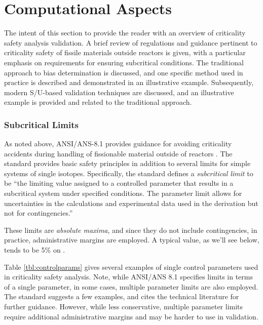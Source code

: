 
\section*{Computational Aspects}

The intent of this section to provide the reader with an 
overview of criticality safety analysis validation. A brief 
review of regulations and guidance pertinent to criticality safety of 
fissile materials outside reactors is given, with a particular emphasis on 
requirements for ensuring subcritical conditions. The traditional approach to 
bias determination is discussed, and one specific method used in practice
is described and demonstrated in an illustrative example. Subsequently, 
modern S/U-based validation techniques are discussed, and an 
illustrative example is provided and related to the traditional approach.


\subsubsection{Subcritical Limits}

As noted above, ANSI/ANS-8.1 provides guidance 
for avoiding criticality accidents during handling of fissionable material 
outside of reactors \cite{ans8_1}. The standard provides basic safety principles 
in addition to several limits for simple systems of single isotopes.  
Specifically, the standard defines a \textit{subcritical limit} to be ``the 
limiting value assigned to a controlled parameter that results in a subcritical 
system under specified conditions. The parameter limit allows for 
uncertainties in the calculations and experimental data used in the derivation 
but not for contingencies.''

These limits are \textit{absolute maxima}, and since they do not include 
contingencies, in practice, administrative margins are employed.  A typical 
value, as we'll see below, tends to be 5\% on \keff.

Table \ref{tbl:controlparams} gives several examples of single control 
parameters used in criticality safety analysis.  Note, while ANSI/ANS 8.1 
specifies limits in terms of a single parameter, in some cases, multiple 
parameter limits are also employed.  The standard suggests a few examples, and
cites the technical literature for further guidance. However, while less 
conservative, multiple 
parameter limits require additional administrative margins and may be harder to 
use in validation.

